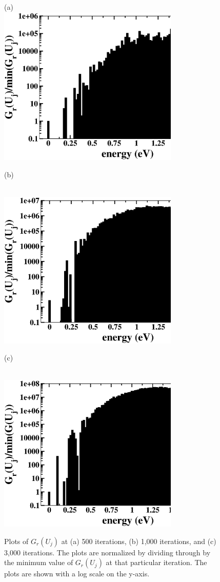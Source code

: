 \documentclass[aps,pre,reprint,superscriptaddress,showkeys]{revtex4-1}
\begin{document}
\begin{figure}[h!]
(a)\\
\includegraphics[width=8.6cm]{fig7a.eps}
\centerline{(b)}\\
\includegraphics[width=8.6cm]{fig7b.eps}
\centerline{(c)}\\
\includegraphics[width=8.6cm]{fig7c.eps}
\caption{Plots of $G_r(U_j)$ at (a) 500 iterations, (b) 1,000 iterations, and (c) 3,000 iterations. The plots are normalized by dividing through by the minimum value of $G_r(U_j)$ at that particular iteration. The plots are shown with a log scale on the y-axis.  \label{converge_GE}}
\end{figure}
\end{document}
